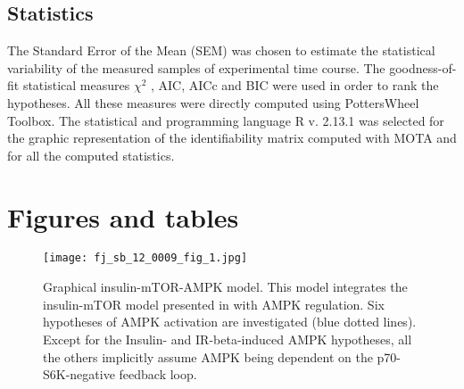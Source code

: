 \subsection{Statistics}
\label{paper2-subsec:Statistics}
The Standard Error of the Mean (SEM) was chosen to estimate the statistical variability of the measured samples of experimental time course. The goodness-of-fit statistical measures $\chi^2$ \citep{Maiwald2008}, AIC, AICc \citep{Akaike1973} and BIC \citep{Schwarz1978} were used in order to rank the hypotheses. All these measures were directly computed using PottersWheel Toolbox. The statistical and programming language R v. 2.13.1 \citep{RCoreTeam} was selected for the graphic representation of the identifiability matrix computed with MOTA and for all the computed statistics.


\section{Figures and tables}
\label{paper2-sec:Figures and tables}

\begin{figure}[tb]
	\begin{center}
		\texttt{[image: fj\_sb\_12\_0009\_fig\_1.jpg]}
		\caption[Graphical insulin-mTOR-AMPK model]{Graphical insulin-mTOR-AMPK model. This model integrates the insulin-mTOR model presented in \citep{DallePezze2012a} with AMPK regulation. Six hypotheses of AMPK activation are investigated (blue dotted lines). Except for the Insulin- and IR-beta-induced AMPK hypotheses, all the others implicitly assume AMPK being dependent on the p70-S6K-negative feedback loop.}
		\label{fig:fj_sb_12_0009_fig_1}
	\end{center}
\end{figure}
\clearpage

